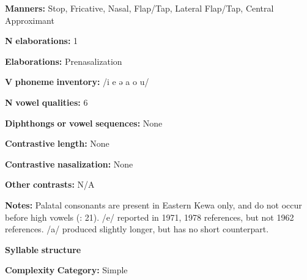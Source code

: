 \begin{styleBody}
\textbf{Manners:} Stop, Fricative, Nasal, Flap/Tap, Lateral Flap/Tap, Central Approximant
\end{styleBody}

\begin{styleBody}
\textbf{N} \textbf{elaborations:} 1
\end{styleBody}

\begin{styleBody}
\textbf{Elaborations:} Prenasalization
\end{styleBody}

\begin{styleBody}
\textbf{V} \textbf{phoneme} \textbf{inventory:} /i e ə a o u/
\end{styleBody}

\begin{styleBody}
\textbf{N} \textbf{vowel} \textbf{qualities:} 6
\end{styleBody}

\begin{styleBody}
\textbf{Diphthongs} \textbf{or} \textbf{vowel} \textbf{sequences:} None
\end{styleBody}

\begin{styleBody}
\textbf{Contrastive} \textbf{length:} None
\end{styleBody}

\begin{styleBody}
\textbf{Contrastive} \textbf{nasalization:} None
\end{styleBody}

\begin{styleBody}
\textbf{Other} \textbf{contrasts:} N/A
\end{styleBody}

\begin{styleBody}
\textbf{Notes:} Palatal consonants are present in Eastern Kewa only, and do not occur before high vowels (\citealt{FranklinFranklin1978}: 21). /e/ reported in 1971, 1978 references, but not 1962 references. /a/ produced slightly longer, but has no short counterpart.
\end{styleBody}

\begin{styleBody}
\textbf{Syllable} \textbf{structure}
\end{styleBody}

\begin{styleBody}
\textbf{Complexity} \textbf{Category:} Simple
\end{styleBody}

